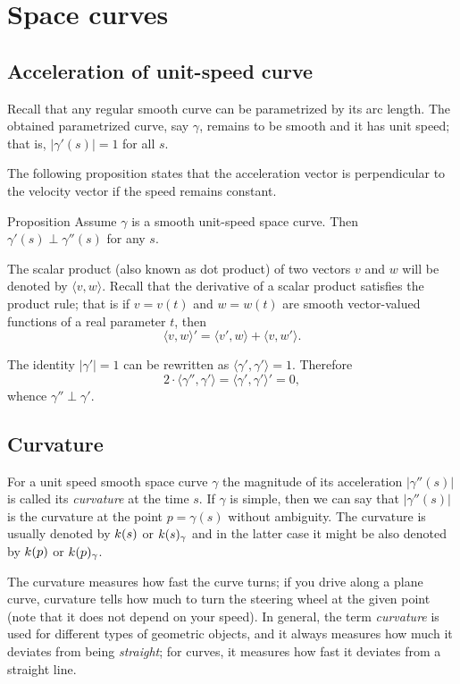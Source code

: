 \chapter{Space curves}

\section*{Acceleration of unit-speed curve}

Recall that any regular smooth curve can be parametrized by its arc length.
The obtained parametrized curve, say $\gamma$, remains to be smooth and it has unit speed; 
that is, $|\gamma'(s)|=1$ for all $s$.

The following proposition states that the acceleration vector is perpendicular to the velocity vector if the speed remains constant.

\begin{thm}{Proposition}\label{prop:a'-pertp-a''}
Assume $\gamma$ is a smooth unit-speed space curve.
Then $\gamma'(s)\perp \gamma''(s)$ for any $s$.
\end{thm}

The scalar product (also known as dot product) of two vectors $v$ and $w$ will be denoted by $\langle v,w\rangle$.
Recall that the derivative of a scalar product satisfies the product rule;
that is if $v=v(t)$ and $w=w(t)$ are smooth vector-valued functions of a real parameter $t$, then
\[\langle v,w\rangle'=\langle v',w\rangle+\langle v,w'\rangle.\]

The identity $|\gamma'|=1$ can be rewritten as $\langle\gamma',\gamma'\rangle=1$.
Therefore
\[2\cdot\langle\gamma'',\gamma'\rangle=\langle\gamma',\gamma'\rangle'=0,\]
whence $\gamma''\perp\gamma'$.
\qeds

\section*{Curvature}

For a unit speed smooth space curve $\gamma$ the magnitude of its acceleration $|\gamma''(s)|$ is called its \emph{curvature} at the time $s$.
\label{page:curvature}
If $\gamma$ is simple, then we can say that $|\gamma''(s)|$ is the curvature at the point $p=\gamma(s)$ without ambiguity.
The curvature is usually denoted by $k(s)$ or $k(s)_\gamma$ %
and in the latter case it might be also denoted by $k(p)$ or $k(p)_\gamma$. %

The curvature measures how fast the curve turns;
if you drive along a plane curve, curvature tells how much to turn the steering wheel at the given point (note that it does not depend on your speed).
In general, the term \emph{curvature} is used for different types of geometric objects, and it always measures how much it deviates from being \emph{straight};
for curves, it measures how fast it deviates from a straight line.

